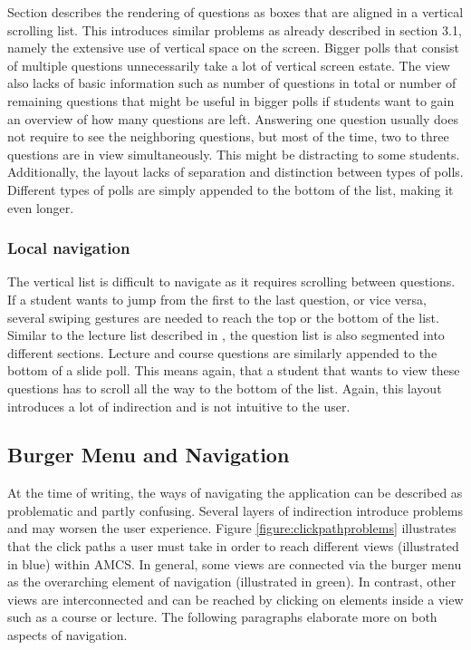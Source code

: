 Section \todosct describes the rendering of questions as boxes that are aligned in a vertical scrolling list. This introduces similar problems as already described in section 3.1, namely the extensive use of vertical space on the screen. Bigger polls that consist of multiple questions unnecessarily take a lot of vertical screen estate. The view also lacks of basic information such as number of questions in total or number of remaining questions that might be useful in bigger polls if students want to gain an overview of how many questions are left.
Answering one question usually does not require to see the neighboring questions, but most of the time, two to three questions are in view simultaneously. This might be distracting to some students.
Additionally, the layout lacks of separation and distinction between types of polls.
Different types of polls are simply appended to the bottom of the list, making it even longer.

\subsubsection{Local navigation}

The vertical list is difficult to navigate as it requires scrolling between questions. If a student wants to jump from the first to the last question,  or vice versa, several swiping gestures are needed to reach the top or the bottom of the list.
Similar to the lecture list described in \todosct, the question list is also segmented into different sections. Lecture and course questions are similarly appended to the bottom of a slide poll. This means again, that a student that wants to view these questions has to scroll all the way to the bottom of the list. Again, this layout introduces a lot of indirection and is not intuitive to the user.


\subsection{Burger Menu and Navigation}

At the time of writing, the ways of navigating the application can be described as problematic and partly confusing. Several layers of indirection introduce problems and may worsen the user experience.
Figure \ref{figure:clickpathproblems} illustrates that the click paths a user must take in order to reach different views (illustrated in blue) within AMCS. In general, some views are connected via the burger menu as the overarching element of navigation (illustrated in green). In contrast, other views are interconnected and can be reached by clicking on elements inside a view such as a course or lecture. The following paragraphs elaborate more on both aspects of navigation.

